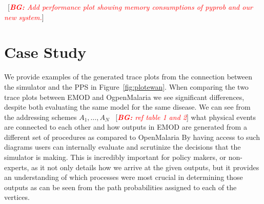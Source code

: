 \documentclass{article}
\newcommand{\bg}[1]{~{{[{\it \textcolor{red}{{\bf BG:} #1}}]}}}
\begin{document}
\bg{Add performance plot showing memory consumptions of pyprob and our new system.}
\section{Case Study}
\label{sec:casestudy}


We provide examples of the generated trace plots from the connection between the simulator and the PPS in Figure~\ref{fig:plotewan}. 
When comparing the two trace plots between EMOD and OgpenMalaria we see significant differences, despite both evaluating the same model for the same disease. 
We can see from the addressing schemes $A_1, \ldots, A_N$ \bg{ref table 1 and 2} what physical events are connected to each other and how outputs in EMOD are generated from a different set of procedures as compared to OpenMalaria 
By having access to such diagrams users can internally evaluate and scrutinize the decisions that the simulator is making.
This is incredibly important for policy makers, or non-experts, as it not only details how we arrive at the given outputs, but it provides an understanding of which processes were most crucial in determining those outputs as can be seen from the path probabilities assigned to each of the vertices.



% 









\end{document}

